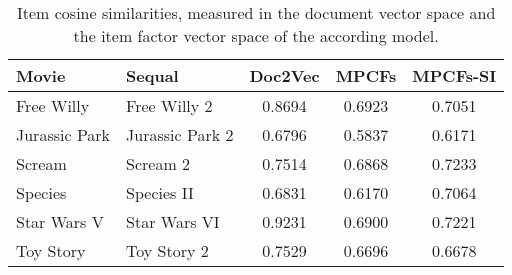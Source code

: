 \begin{table}[h]
	\begin{center}
		\begin{tabularx}{0.9\linewidth}{XXccc}
			\hline \hline
			\textbf{Movie} & \textbf{Sequal} & \textbf{Doc2Vec} & \textbf{MPCFs} & \textbf{MPCFs-SI} \\
			\hline
			Free Willy & Free Willy 2 & 0.8694 & 0.6923 & 0.7051 \\
			Jurassic Park & Jurassic Park 2 & 0.6796 & 0.5837 & 0.6171 \\
			Scream & Scream 2 & 0.7514 & 0.6868 & 0.7233 \\
			Species & Species II & 0.6831 & 0.6170 & 0.7064 \\
			Star Wars V & Star Wars VI & 0.9231 & 0.6900 & 0.7221\\
			Toy Story & Toy Story 2 & 0.7529 & 0.6696 & 0.6678 \\
			\hline \hline
		\end{tabularx}
	\end{center}
	\caption{Item cosine similarities, measured in the document vector space and the item factor vector space of the according model.}
	\label{tab:item-factor-sim}
\end{table}